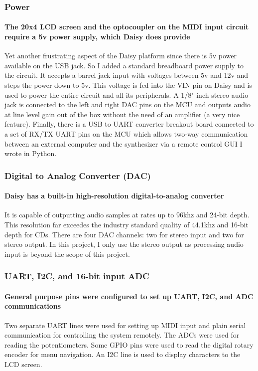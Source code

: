\documentclass[acmlarge,screen]{acmart}
\begin{document}
	\subsubsection{Power}
	\paragraph{The 20x4 LCD screen and the optocoupler on the MIDI input circuit require a 5v power supply, which Daisy does provide} Yet another frustrating aspect of the Daisy platform since there is 5v power available on the USB jack. So I added a standard breadboard power supply to the circuit. It accepts a barrel jack input with voltages between 5v and 12v and steps the power down to 5v. This voltage is fed into the VIN pin on Daisy and is used to power the entire circuit and all its peripherals. A 1/8" inch stereo audio jack is connected to the left and right DAC pins on the MCU and outputs audio at line level gain out of the box without the need of an amplifier (a very nice feature). Finally, there is a USB to UART converter breakout board connected to a set of RX/TX UART pins on the MCU which allows two-way communication between an external computer and the synthesizer via a remote control GUI I wrote in Python.
	
	\subsubsection{Digital to Analog Converter (DAC)} 
	\paragraph{Daisy has a built-in high-resolution digital-to-analog converter} It is capable of outputting audio samples at rates up to 96khz and 24-bit depth. This resolution far exceedes the industry standard quality of 44.1khz and 16-bit depth for CDs. There are four DAC channels: two for stereo input and two for stereo output. In this project, I only use the stereo output as processing audio input is beyond the scope of this project.

	\subsubsection{UART, I2C, and 16-bit input ADC}
	\paragraph{General purpose pins were configured to set up UART, I2C, and ADC communications} Two separate UART lines were used for setting up MIDI input and plain serial communication for controlling the system remotely. The ADCs were used for reading the potentiometers. Some GPIO pins were used to read the digital rotary encoder for menu navigation. An I2C line is used to display characters to the LCD screen.
\end{document}
